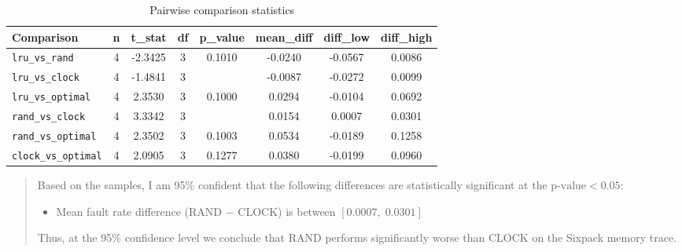 \documentclass[a4paper, 11pt]{report}
\begin{document}
    \begin{table}[ht]
        \centering
        \label{tab:pairwise_latest}
        \begin{tabular}{l
                        S[table-format=1.0]
                        S[table-format=-2.4]
                        S[table-format=1.0]
                        S[table-format=1.4]
                        S[table-format=-1.4]
                        S[table-format=-1.4]
                        S[table-format=1.4]}
            \toprule
            {Comparison} & {n} & {t\_stat} & {df} & {p\_value} & {mean\_diff} & {diff\_low} & {diff\_high} \\
            \midrule
            \texttt{lru\_vs\_rand}     & 4 & -2.3425 & 3 & 0.1010 & -0.0240 & -0.0567 & 0.0086 \\
            \texttt{lru\_vs\_clock}    & 4 & -1.4841 & 3 &  & -0.0087 & -0.0272 & 0.0099 \\
            \texttt{lru\_vs\_optimal}  & 4 &  2.3530 & 3 & 0.1000 &  0.0294 & -0.0104 & 0.0692 \\
            \texttt{rand\_vs\_clock}   & 4 &  3.3342 & 3 &  &  0.0154 &  0.0007 & 0.0301 \\
            \texttt{rand\_vs\_optimal} & 4 &  2.3502 & 3 & 0.1003 &  0.0534 & -0.0189 & 0.1258 \\
            \texttt{clock\_vs\_optimal}& 4 &  2.0905 & 3 & 0.1277 &  0.0380 & -0.0199 & 0.0960 \\
            \bottomrule
        \end{tabular}
        \caption{Pairwise comparison statistics\cite{psu_paired}}
    \end{table}
    \begin{quote}
        Based on the samples, I am 95\% confident that the following differences are statistically significant at the $\text{p-value}<0.05$\cite{psu_paired}: 
        \begin{itemize}
            \item Mean fault rate difference (RAND $-$ CLOCK) is between $[0.0007,\;0.0301]$
        \end{itemize}
            Thus, at the 95\% confidence level we conclude that RAND performs significantly worse than CLOCK on the Sixpack memory trace.
    \end{quote}
\end{document}
